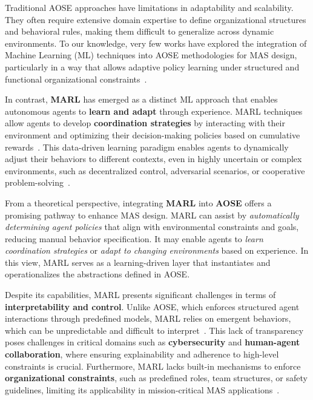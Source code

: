 \documentclass[pdflatex,sn-mathphys-num]{sn-jnl}%
\theoremstyle{thmstyleone}%
\theoremstyle{thmstyletwo}%
\theoremstyle{thmstylethree}%
\begin{document}
Traditional AOSE approaches have limitations in adaptability and scalability. They often require extensive domain expertise to define organizational structures and behavioral rules, making them difficult to generalize across dynamic environments. To our knowledge, very few works have explored the integration of Machine Learning (ML) techniques into AOSE methodologies for MAS design, particularly in a way that allows adaptive policy learning under structured and functional organizational constraints~\cite{Garcia2004}.

In contrast, \textbf{MARL} has emerged as a distinct ML approach that enables autonomous agents to \textbf{learn and adapt} through experience. MARL techniques allow agents to develop \textbf{coordination strategies} by interacting with their environment and optimizing their decision-making policies based on cumulative rewards~\cite{Zhang2021}. This data-driven learning paradigm enables agents to dynamically adjust their behaviors to different contexts, even in highly uncertain or complex environments, such as decentralized control, adversarial scenarios, or cooperative problem-solving~\cite{Papoudakis2021}.

From a theoretical perspective, integrating \textbf{MARL} into \textbf{AOSE} offers a promising pathway to enhance MAS design. MARL can assist by \textit{automatically determining agent policies} that align with environmental constraints and goals, reducing manual behavior specification. It may enable agents to \textit{learn coordination strategies} or \textit{adapt to changing environments} based on experience. In this view, MARL serves as a learning-driven layer that instantiates and operationalizes the abstractions defined in AOSE.

Despite its capabilities, MARL presents significant challenges in terms of \textbf{interpretability and control}. Unlike AOSE, which enforces structured agent interactions through predefined models, MARL relies on emergent behaviors, which can be unpredictable and difficult to interpret~\cite{Du2022}. This lack of transparency poses challenges in critical domains such as \textbf{cybersecurity} and \textbf{human-agent collaboration}, where ensuring explainability and adherence to high-level constraints is crucial. Furthermore, MARL lacks built-in mechanisms to enforce \textbf{organizational constraints}, such as predefined roles, team structures, or safety guidelines, limiting its applicability in mission-critical MAS applications~\cite{Nguyen2020}.
\end{document}

